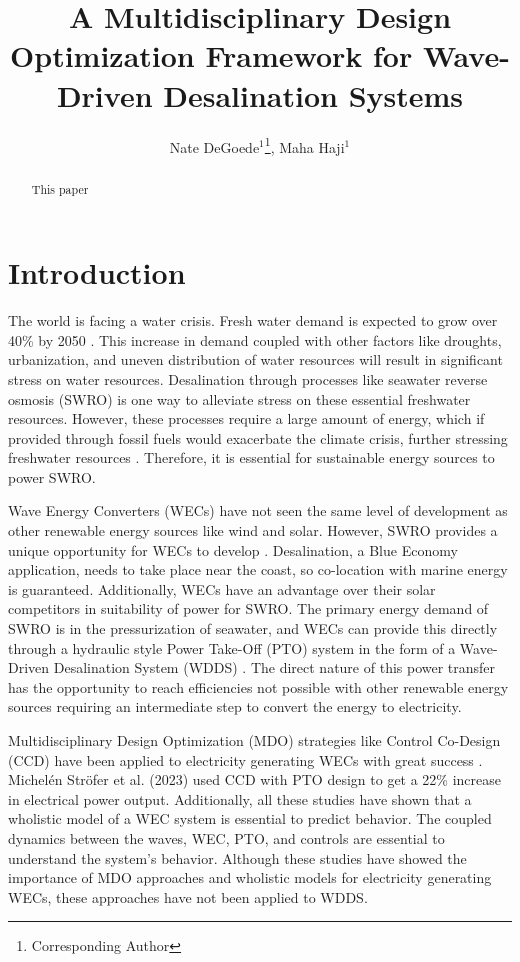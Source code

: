 \documentclass[twocolumn,10pt]{asme2e}
\title{ \vspace{-10 mm} A Multidisciplinary Design Optimization Framework for Wave-Driven Desalination Systems}
\author{Nate DeGoede$^1$\thanks{Corresponding Author}, Maha Haji$^1$
    \affiliation{
	$^1$Sibley School of Mechanical and Aerospace Engineering\\
	Cornell University\\
	Ithaca, New York 14853\\
    Email: \{njd76, maha\}@cornell.edu 
    }
}
\begin{document}
\maketitle
\setlength{\abovedisplayskip}{10pt}
\setlength{\belowdisplayskip}{10pt}

\begin{abstract}

This paper
\end{abstract}


\section{Introduction}

The world is facing a water crisis. Fresh water demand is expected to grow over 40\% by 2050 \cite{watershortage2015}. This increase in demand coupled with other factors like droughts, urbanization, and uneven distribution of water resources will result in significant stress on water resources. Desalination through processes like seawater reverse osmosis (SWRO) is one way to alleviate stress on these essential freshwater resources. However, these processes require a large amount of energy, which if provided through fossil fuels would exacerbate the climate crisis, further stressing freshwater resources \cite{nytdrought}. Therefore, it is essential for sustainable energy sources to power SWRO. 

Wave Energy Converters (WECs) have not seen the same level of development as other renewable energy sources like wind and solar. However, SWRO provides a unique opportunity for WECs to develop \cite{blue_econ}. Desalination, a Blue Economy application, needs to take place near the coast, so co-location with marine energy is guaranteed. Additionally, WECs have an advantage over their solar competitors in suitability of power for SWRO. The primary energy demand of SWRO is in the pressurization of seawater, and WECs can provide this directly through a hydraulic style Power Take-Off (PTO) system in the form of a Wave-Driven Desalination System (WDDS) \cite{Davies2005}. The direct nature of this power transfer has the opportunity to reach efficiencies not possible with other renewable energy sources requiring an intermediate step to convert the energy to electricity. 

Multidisciplinary Design Optimization (MDO) strategies like Control Co-Design (CCD) have been applied to electricity generating WECs with great success \cite{Stroefer2023,PenaSanchez2022,Rosati2023,Grasberger2024}. Michelén Ströfer et al. (2023) used CCD with PTO design to get a 22\% increase in electrical power output. Additionally, all these studies have shown that a wholistic model of a WEC system is essential to predict behavior. The coupled dynamics between the waves, WEC, PTO, and controls are essential to understand the system's behavior. Although these studies have showed the importance of MDO approaches and wholistic models for electricity generating WECs, these approaches have not been applied to WDDS.
\end{document}
